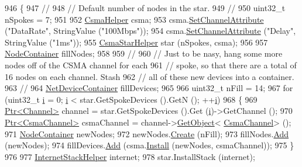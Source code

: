 \begin{DoxyCode}
946 \{
947   \textcolor{comment}{//}
948   \textcolor{comment}{// Default number of nodes in the star.}
949   \textcolor{comment}{//}
950   uint32\_t nSpokes = 7;
951 
952   \hyperlink{classns3_1_1CsmaHelper}{CsmaHelper} csma;
953   csma.\hyperlink{classns3_1_1CsmaHelper_a886d900b2fe44433e0b81752dea7e7f1}{SetChannelAttribute} (\textcolor{stringliteral}{"DataRate"}, StringValue (\textcolor{stringliteral}{"100Mbps"}));
954   csma.\hyperlink{classns3_1_1CsmaHelper_a886d900b2fe44433e0b81752dea7e7f1}{SetChannelAttribute} (\textcolor{stringliteral}{"Delay"}, StringValue (\textcolor{stringliteral}{"1ms"}));
955   \hyperlink{classns3_1_1CsmaStarHelper}{CsmaStarHelper} star (nSpokes, csma);
956 
957   \hyperlink{classns3_1_1NodeContainer}{NodeContainer} fillNodes;
958 
959   \textcolor{comment}{//}
960   \textcolor{comment}{// Just to be nasy, hang some more nodes off of the CSMA channel for each}
961   \textcolor{comment}{// spoke, so that there are a total of 16 nodes on each channel.  Stash}
962   \textcolor{comment}{// all of these new devices into a container.}
963   \textcolor{comment}{//}
964   \hyperlink{classns3_1_1NetDeviceContainer}{NetDeviceContainer} fillDevices;
965 
966   uint32\_t nFill = 14;
967   \textcolor{keywordflow}{for} (uint32\_t \hyperlink{bernuolliDistribution_8m_a6f6ccfcf58b31cb6412107d9d5281426}{i} = 0; \hyperlink{bernuolliDistribution_8m_a6f6ccfcf58b31cb6412107d9d5281426}{i} < star.GetSpokeDevices ().GetN (); ++\hyperlink{bernuolliDistribution_8m_a6f6ccfcf58b31cb6412107d9d5281426}{i})
968     \{
969       \hyperlink{classns3_1_1Ptr}{Ptr<Channel>} channel = star.GetSpokeDevices ().Get (\hyperlink{bernuolliDistribution_8m_a6f6ccfcf58b31cb6412107d9d5281426}{i})->GetChannel ();
970       \hyperlink{classns3_1_1Ptr}{Ptr<CsmaChannel>} csmaChannel = channel->\hyperlink{classns3_1_1Object_a13e18c00017096c8381eb651d5bd0783}{GetObject}<
      \hyperlink{classns3_1_1CsmaChannel}{CsmaChannel}> ();
971       \hyperlink{classns3_1_1NodeContainer}{NodeContainer} newNodes;
972       newNodes.\hyperlink{classns3_1_1NodeContainer_a787f059e2813e8b951cc6914d11dfe69}{Create} (nFill);
973       fillNodes.\hyperlink{classns3_1_1NodeContainer_aa60b3a0e70f2fb324e16ffcf8bf31fcb}{Add} (newNodes);
974       fillDevices.\hyperlink{classns3_1_1NetDeviceContainer_a7ca8bc1d7ec00fd4fcc63869987fbda5}{Add} (csma.\hyperlink{classns3_1_1CsmaHelper_af79a91372595230b0817200270ab84e7}{Install} (newNodes, csmaChannel));
975     \}
976 
977   \hyperlink{classns3_1_1InternetStackHelper}{InternetStackHelper} internet;
978   star.InstallStack (internet);

\end{DoxyCode}
